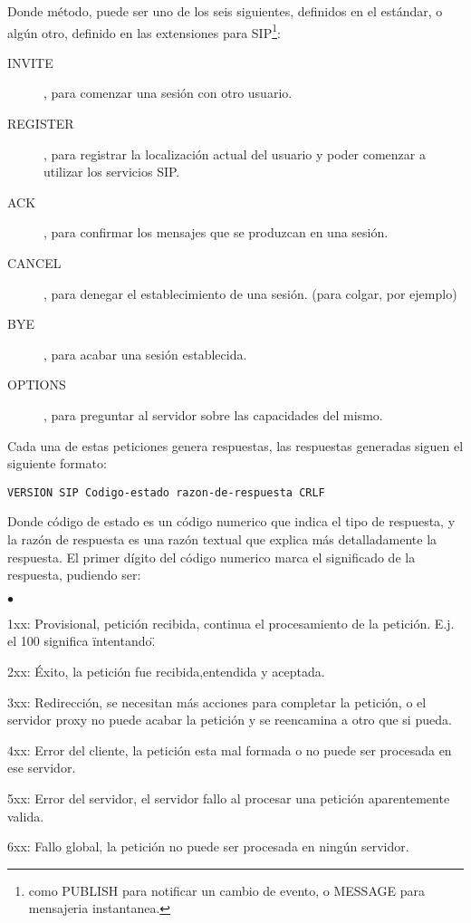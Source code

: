 Donde método, puede ser uno de los seis siguientes, definidos en el estándar, o algún otro, definido en las extensiones para SIP\footnote{como PUBLISH para notificar un cambio de evento\cite{rfc3903}, o MESSAGE\cite{rfc3428} para mensajeria instantanea.}:

\begin{description}
\item[INVITE], para comenzar una sesión con otro usuario.

\item[REGISTER], para registrar la localización actual del usuario y poder comenzar a utilizar los servicios SIP.
\item[ACK], para confirmar los mensajes que se produzcan en una sesión.
\item[CANCEL] , para denegar el establecimiento de una sesión. (para colgar, por ejemplo)
\item[BYE], para acabar una sesión establecida.
\item[OPTIONS], para preguntar al servidor sobre las capacidades del mismo.

\end{description}

Cada una de estas peticiones genera respuestas, las respuestas generadas siguen el siguiente formato:

\begin{verbatim}
VERSION SIP Codigo-estado razon-de-respuesta CRLF
\end{verbatim}

Donde código de estado es un código numerico que indica el tipo de respuesta, y la razón de respuesta es una razón textual que explica más detalladamente la respuesta. El primer dígito del código numerico marca el significado de la respuesta, pudiendo ser:

\begin{list}{$\bullet$}{}
\item 1xx: Provisional, petición recibida, continua el procesamiento de la petición. E.j. el 100 significa \"intentando\".
\item 2xx: Éxito, la petición fue recibida,entendida y aceptada.
\item 3xx: Redirección, se necesitan más acciones para completar la petición, o el servidor proxy no puede acabar la petición y se reencamina a otro que si pueda.

\item 4xx: Error del cliente, la petición esta mal formada o no puede ser procesada en ese servidor.

\item 5xx: Error del servidor, el servidor fallo al procesar una petición aparentemente valida.
\item 6xx: Fallo global, la petición no puede ser procesada en ningún servidor.
\end{list}

